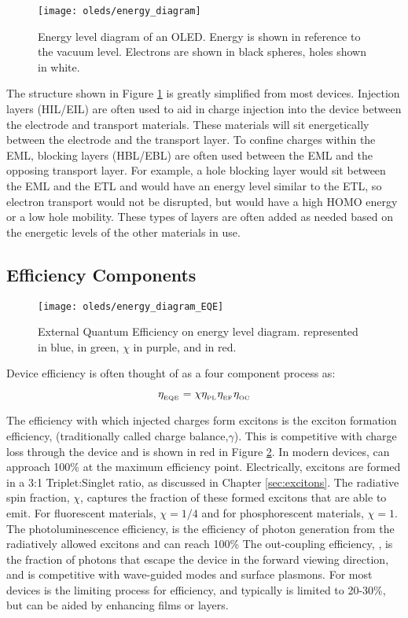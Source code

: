 \documentclass[../thesis.tex]{subfiles}
\begin{document}
\begin{figure}[ht]
\centering
\texttt{[image: oleds/energy\_diagram]}
\caption{Energy level diagram of an OLED.  Energy is shown in reference to the vacuum level.  Electrons are shown in black spheres, holes shown in white.}
\label{fig:oleds_energy_level_diagram}
\end{figure}

The structure shown in Figure \ref{fig:oleds_energy_level_diagram} is greatly simplified from most devices.
Injection layers (HIL/EIL) are often used to aid in charge injection into the device between the electrode and transport materials.
These materials will sit energetically between the electrode and the transport layer.
To confine charges within the EML, blocking layers (HBL/EBL) are often used between the EML and the opposing transport layer.
For example, a hole blocking layer would sit between the EML and the ETL and would have an energy level similar to the ETL, so electron transport would not be disrupted, but would have a high HOMO energy or a low hole mobility.
These types of layers are often added as needed based on the energetic levels of the other materials in use.

\subsection{Efficiency Components}

\begin{figure}[ht]
\centering
\texttt{[image: oleds/energy\_diagram\_EQE]}
\caption{External Quantum Efficiency on energy level diagram.  \oc represented in blue, \pl in green, $\chi$ in purple, and \ef in red.}
\label{fig:oleds_energy_level_diagram_EQE}
\end{figure}

Device efficiency is often thought of as a four component process as:\supercite{Baldo1998a}

\begin{equation}
\eta_{_\text{\tiny EQE}}=\chi\eta_{_\text{\tiny PL}}\eta_{_\text{\tiny EF}}\eta_{_\text{\tiny OC}}
\label{eqn:eqe}
\end{equation}

The efficiency with which injected charges form excitons is the exciton formation efficiency, \ef (traditionally called charge balance,$\gamma$).
This is competitive with charge loss through the device and is shown in red in Figure \ref{fig:oleds_energy_level_diagram_EQE}.
In modern devices, \ef can approach 100\% at the maximum efficiency point.
Electrically, excitons are formed in a 3:1 Triplet:Singlet ratio, as discussed in Chapter \ref{sec:excitons}.
The radiative spin fraction, $\chi$, captures the fraction of these formed excitons that are able to emit.
For fluorescent materials, $\chi=1/4$ and for phosphorescent materials, $\chi=1$.
The photoluminescence efficiency, \pl is the efficiency of photon generation from the radiatively allowed excitons and can reach 100\%
The out-coupling efficiency, \oc, is the fraction of photons that escape the device in the forward viewing direction, and is competitive with wave-guided modes and surface plasmons.\supercite{Furno2010,Furno2012}
For most devices \oc is the limiting process for efficiency, and typically is limited to 20-30\%, but can be aided by enhancing films or layers.
\end{document}
